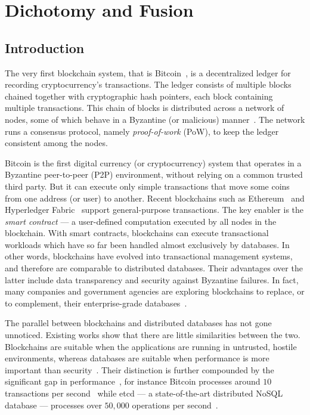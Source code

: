 \chapter{Dichotomy and Fusion}
\label{ch:twin}
\section{Introduction}
\label{sec:twin:intro}

The very first blockchain system, that is Bitcoin~\cite{nakamoto2019bitcoin}, is a decentralized ledger for
recording cryptocurrency's transactions. The ledger consists of multiple blocks chained together with cryptographic
hash pointers, each block containing multiple transactions. This chain of blocks is distributed    
across a network of nodes, some of which behave in a Byzantine (or malicious) manner~\cite{Lamport_BFT}. The network runs a
consensus protocol, namely \textit{proof-of-work} (PoW), to keep the ledger consistent among the nodes.  

Bitcoin is the first digital currency (or cryptocurrency) system that
operates in a Byzantine \cite{Lamport_BFT} peer-to-peer (P2P) environment, without relying on a common trusted
third party.
But it can execute only simple transactions that move some coins from one address (or user) to another.
Recent blockchains such as Ethereum~\cite{wood2014ethereum} and Hyperledger
Fabric~\cite{androulaki2018hyperledger} support general-purpose transactions. The key enabler is the {\em
smart contract} --- a user-defined computation executed by all nodes in the blockchain. 
With smart contracts, blockchains can execute transactional workloads which have so far been handled almost
exclusively by 
databases.  In other words, blockchains have evolved into transactional management systems, and therefore are
comparable to distributed databases. Their advantages over the latter include data transparency and security
against Byzantine failures. 
In fact, many companies and government agencies are exploring blockchains to replace, or to complement, their
enterprise-grade databases~\cite{mougayar2016business,morabito2017business,crosby2016blockchain}.

The parallel between blockchains and distributed databases has not gone
unnoticed. Existing works show that there are little similarities between the
two. Blockchains are suitable when the applications are running in untrusted,
hostile environments, whereas databases are suitable when performance is more
important than security~\cite{crosby2016blockchain,
wust2018you,chowdhury2018blockchain,yaga2018blockchain}. Their distinction is
further compounded by the significant gap in
performance~\cite{dinh2017blockbench}, for instance Bitcoin processes around
$10$ transactions per second~\cite{bitcoin_tps} while etcd --- a
state-of-the-art distributed NoSQL database --- processes over $50,000$
operations per second~\cite{etcd_perf}.

